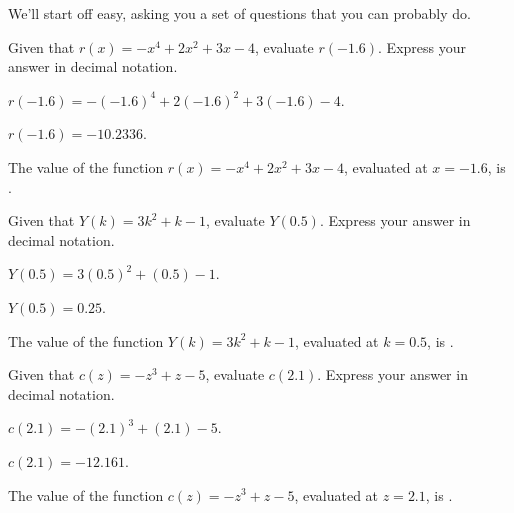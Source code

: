 

We'll start off easy, asking you a set of questions that you can
probably do.


\begin{shuffle}
\begin{exercise}
Given that $r(x)=-x^4+2 x^2+3 x-4$, evaluate $r(-1.6)$. Express your answer in decimal notation.
\begin{solution}
\begin{hint}
$r(-1.6)=-(-1.6)^4+2 (-1.6)^2+3 (-1.6)-4$.
\end{hint}
\begin{hint}
$r(-1.6)=-10.2336$.
\end{hint}
The value of the function $r(x)=-x^4+2 x^2+3 x-4$, evaluated at $x=-1.6$, is .
\end{solution}
\end{exercise}

\begin{exercise}
Given that $Y(k)=3 k^2+k-1$, evaluate $Y(0.5)$. Express your answer in decimal notation.
\begin{solution}
\begin{hint}
$Y(0.5)=3 (0.5)^2+(0.5)-1$.
\end{hint}
\begin{hint}
$Y(0.5)=0.25$.
\end{hint}
The value of the function $Y(k)=3 k^2+k-1$, evaluated at $k=0.5$, is .
\end{solution}
\end{exercise}

\begin{exercise}
Given that $c(z)=-z^3+z-5$, evaluate $c(2.1)$. Express your answer in decimal notation.
\begin{solution}
\begin{hint}
$c(2.1)=-(2.1)^3+(2.1)-5$.
\end{hint}
\begin{hint}
$c(2.1)=-12.161$.
\end{hint}
The value of the function $c(z)=-z^3+z-5$, evaluated at $z=2.1$, is .
\end{solution}
\end{exercise}


\end{shuffle}
